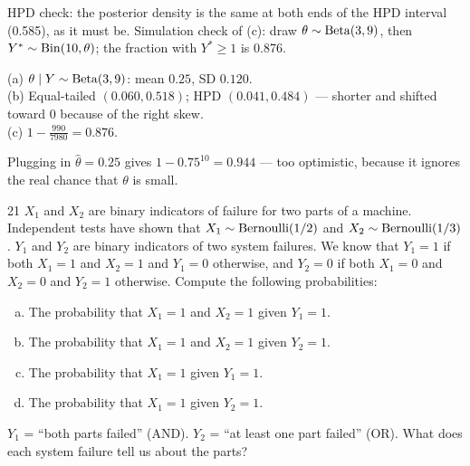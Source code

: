 \documentclass[11pt]{article}
\begin{document}
\begin{sanity}
HPD check: the posterior density is the same at both ends of the HPD interval (0.585), as it must be. Simulation check of (c): draw $\theta\sim\mathrm{Beta}(3,9)$, then $Y^*\sim\mathrm{Bin}(10,\theta)$; the fraction with $Y^*\ge1$ is 0.876.
\end{sanity}

\begin{answer}
(a) $\theta\mid Y\sim\mathrm{Beta}(3,9)$: mean $0.25$, SD $0.120$.\\
(b) Equal-tailed $(0.060,0.518)$; HPD $(0.041,0.484)$ --- shorter and shifted toward 0 because of the right skew.\\
(c) $1-\frac{990}{7980}=\mathbf{0.876}$.
\end{answer}

\begin{takeaway}
Plugging in $\hat\theta=0.25$ gives $1-0.75^{10}=0.944$ --- too optimistic, because it ignores the real chance that $\theta$ is small.
\end{takeaway}


\begin{problem}{21}
$X_1$ and $X_2$ are binary indicators of failure for two parts of a machine. Independent tests have shown that $X_1\sim\mathrm{Bernoulli}(1/2)$ and $X_2\sim\mathrm{Bernoulli}(1/3)$. $Y_1$ and $Y_2$ are binary indicators of two system failures. We know that $Y_1=1$ if both $X_1=1$ and $X_2=1$ and $Y_1=0$ otherwise, and $Y_2=0$ if both $X_1=0$ and $X_2=0$ and $Y_2=1$ otherwise. Compute the following probabilities:
\begin{enumerate}[(a)]
\item The probability that $X_1=1$ and $X_2=1$ given $Y_1=1$.
\item The probability that $X_1=1$ and $X_2=1$ given $Y_2=1$.
\item The probability that $X_1=1$ given $Y_1=1$.
\item The probability that $X_1=1$ given $Y_2=1$.
\end{enumerate}
\end{problem}

\begin{restate}
$Y_1$ = ``both parts failed'' (AND). $Y_2$ = ``at least one part failed'' (OR). What does each system failure tell us about the parts?
\end{restate}
\end{document}
